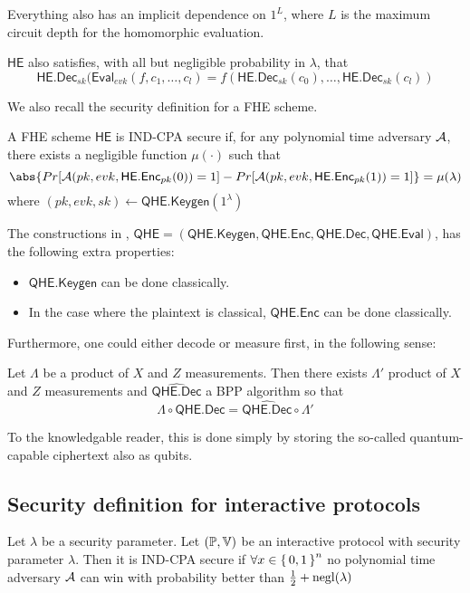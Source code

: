 Everything also has an implicit dependence on $1^L$, where $L$ is the maximum circuit depth for the homomorphic evaluation.

$\mathsf{HE}$ also satisfies, with all but negligible probability in $\lambda$, that
$$\mathsf{HE.Dec}_{sk}(\mathsf{Eval}_{evk}(f, c_1, \ldots, c_l)=f(\mathsf{HE.Dec}_{sk}(c_0),\ldots,\mathsf{HE.Dec}_{sk}(c_l))$$

We also recall the security definition for a FHE scheme.

\begin{dfn}
	A FHE scheme $\mathsf{HE}$ is IND-CPA secure if, for any polynomial time adversary $\mathcal{A}$, there exists a negligible function $\mu(\cdot)$ such that
	$$\abs{Pr[\cA(pk, evk, \mathsf{HE.Enc}_{pk}(0))=1]-Pr[\cA(pk, evk, \mathsf{HE.Enc}_{pk}(1))=1]}=\mu(\lambda)$$
	where $(pk, evk, sk)\leftarrow\mathsf{QHE.Keygen}(1^\lambda)$
\end{dfn}

The constructions in \cite{mahadev_qfhe}, $\mathsf{QHE}=(\mathsf{QHE.Keygen}, \mathsf{QHE.Enc}, \mathsf{QHE.Dec}, \mathsf{QHE.Eval})$, has the following extra properties:
\begin{itemize}
	\item $\mathsf{QHE.Keygen}$ can be done classically.
	\item In the case where the plaintext is classical, $\mathsf{QHE.Enc}$ can be done classically.
\end{itemize}

Furthermore, one could either decode or measure first, in the following sense:
\begin{lemma}
	\label{decodeMeasureOrder}
	Let $\Lambda$ be a product of $X$ and $Z$ measurements. Then there exists $\Lambda'$ product of $X$ and $Z$ measurements and $\widehat{\mathsf{QHE.Dec}}$ a BPP algorithm so that
		$$\Lambda\circ\mathsf{QHE.Dec}=\widehat{\mathsf{QHE.Dec}}\circ\Lambda'$$
\end{lemma}
To the knowledgable reader, this is done simply by storing the so-called quantum-capable ciphertext also as qubits.

\subsection{Security definition for interactive protocols}

\begin{dfn}
	Let $\lambda$ be a security parameter.
	Let $(\mathbb{P}, \mathbb{V})$ be an interactive protocol with security parameter $\lambda$.
	Then it is IND-CPA secure if $\forall x\in\set{0,1}^n$ no polynomial time adversary $\mathcal{A}$ can win  with probability better than $\frac{1}{2}+\operatorname{negl}(\lambda)$
\end{dfn}

